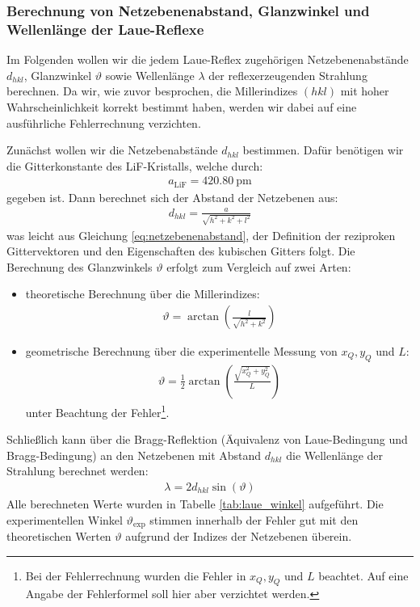 \documentclass[11pt, a4paper]{article}
\begin{document}
\subsubsection{Berechnung von Netzebenenabstand, Glanzwinkel und Wellenlänge der Laue-Reflexe}
Im Folgenden wollen wir die jedem Laue-Reflex zugehörigen Netzebenenabstände $d_{hkl}$, Glanzwinkel $\vartheta$ sowie Wellenlänge $\lambda$ der reflexerzeugenden Strahlung berechnen.
Da wir, wie zuvor besprochen, die Millerindizes $(hkl)$ mit hoher Wahrscheinlichkeit korrekt bestimmt haben, werden wir dabei auf eine ausführliche Fehlerrechnung verzichten.

Zunächst wollen wir die Netzebenabstände $d_{hkl}$ bestimmen.
Dafür benötigen wir die Gitterkonstante des LiF-Kristalls, welche durch:
\begin{align*}
  a_\mathrm{LiF} = \SI{420.80}{\pico\metre}
\end{align*}
gegeben ist\cite{crc}.
Dann berechnet sich der Abstand der Netzebenen aus:
\begin{align}
  d_{hkl} = \frac{a}{\sqrt{h^2+k^2+l^2}}
\end{align}
was leicht aus Gleichung \ref{eq:netzebenenabstand}, der Definition der reziproken Gittervektoren und den Eigenschaften des kubischen Gitters folgt.
Die Berechnung des Glanzwinkels $\vartheta$ erfolgt zum Vergleich auf zwei Arten:
\begin{itemize}
  \item theoretische Berechnung über die Millerindizes:
  \begin{align}
    \vartheta = \arctan{\left( \frac{l}{\sqrt{h^2+k^2}} \right)}
    \label{eq:millerglanzwinkel}
  \end{align}
  
  \item geometrische Berechnung über die experimentelle Messung von $x_Q, y_Q$ und $L$:
  \begin{align}
    \vartheta = \frac{1}{2} \arctan{\left( \frac{\sqrt{x_Q^2 + y_Q^2}}{L} \right)}
  \end{align}
  unter Beachtung der Fehler\footnote{Bei der Fehlerrechnung wurden die Fehler in $x_Q, y_Q$ und $L$ beachtet. Auf eine Angabe der Fehlerformel soll hier aber verzichtet werden.}.
\end{itemize}
Schließlich kann über die Bragg-Reflektion (Äquivalenz von Laue-Bedingung und Bragg-Bedingung) an den Netzebenen mit Abstand $d_{hkl}$ die Wellenlänge der Strahlung berechnet werden:
\begin{align}
  \lambda = 2 d_{hkl} \sin(\vartheta)
\end{align}
Alle berechneten Werte wurden in Tabelle \ref{tab:laue_winkel} aufgeführt.
Die experimentellen Winkel $\vartheta_\mathrm{exp}$ stimmen innerhalb der Fehler gut mit den theoretischen Werten $\vartheta$ aufgrund der Indizes der Netzebenen überein.
\end{document}
